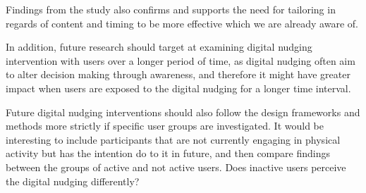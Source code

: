 Findings from the study also confirms and supports the need for tailoring in regards of content and timing to be more effective which we are already aware of. 

In addition, future research should target at examining digital nudging intervention with users over a longer period of time, as digital nudging often aim to alter decision making through awareness, and therefore it might have greater impact when users are exposed to the digital nudging for a longer time interval.

Future digital nudging interventions should also follow the design frameworks and methods more strictly if specific user groups are investigated. It would be interesting to include participants that are not currently engaging in physical activity but has the intention do to it in future, and then compare findings between the groups of active and not active users. Does inactive users perceive the digital nudging differently?



 



